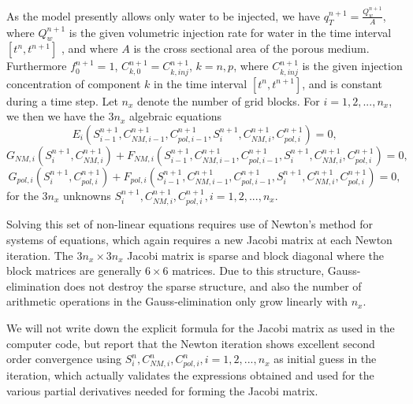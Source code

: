 \documentclass[nanomaterials,article,submit,moreauthors,pdftex]{Definitions/mdpi}
\begin{document}
As the model presently allows only water to be injected, we have  $q_T^{n+1}=\frac{Q_w^{n+1}}{A}$, where $Q_w^{n+1}$ is the given volumetric injection rate for water in the time interval $\left[t^n,t^{n+1}\right]$ , and where $A$ is the cross sectional area of the porous medium. Furthermore $f^{n+1}_0=1$,  $C^{n+1}_{k,0}=C^{n+1}_{k,inj}$, $k=n,p$, where $C^{n+1}_{k,inj}$ is the given injection concentration of component $k$ in the time interval $\left[t^n,t^{n+1}\right]$, and is constant during a time step. Let $n_x$  denote the number of grid blocks. For $i=1,2,...,n_x$, we then we have the $3n_x$  algebraic equations
\begin{equation}
    E_i \left(S^{n+1}_{i-1}, C^{n+1}_{\textit{NM}, i-1}, C^{n+1}_{pol, i-1}, S^{n+1}_{i}, C^{n+1}_{\textit{NM}, i}, C^{n+1}_{pol, i}\right)  = 0, %
\end{equation}
\begin{equation}
    G_{\textit{NM}, i} \left(S^{n+1}_{i}, C^{n+1}_{\textit{NM}, i}\right)+ F_{\textit{NM}, i} \left(S^{n+1}_{i-1}, C^{n+1}_{\textit{NM}, i-1}, C^{n+1}_{pol, i-1}, S^{n+1}_{i}, C^{n+1}_{\textit{NM}, i}, C^{n+1}_{pol, i}\right) =0, %
\end{equation}
\begin{equation}
    G_{\textit{pol}, i} \left(S^{n+1}_{i}, C^{n+1}_{\textit{pol}, i}\right)+ F_{\textit{pol}, i} \left(S^{n+1}_{i-1}, C^{n+1}_{\textit{NM}, i-1}, C^{n+1}_{pol, i-1}, S^{n+1}_{i}, C^{n+1}_{\textit{NM}, i}, C^{n+1}_{pol, i}\right) =0, %
\end{equation}
for the $3n_x$ unknowns $S^{n+1}_{i}, C^{n+1}_{\textit{NM}, i}, C^{n+1}_{pol, i}, i=1,2,...,n_x$.

Solving this set of non-linear equations requires use of Newton’s method for systems of equations, which again requires a new Jacobi matrix at each Newton iteration. The $3n_x \times 3n_x$   Jacobi matrix is sparse and block diagonal where the block matrices are generally $6\times6$  matrices. Due to this structure, Gauss-elimination does not destroy the sparse structure, and also the number of arithmetic operations in the Gauss-elimination only grow linearly with $n_x$. 

We will not write down the explicit formula for the Jacobi matrix as used in the computer code, but report that the Newton iteration shows excellent second order convergence using  $S^{n}_{i}, C^{n}_{\textit{NM}, i}, C^{n}_{pol, i}, i=1,2,...,n_x$   as initial guess in the iteration, which actually validates the expressions obtained and used for the various partial derivatives needed for forming the Jacobi matrix.
\end{document}

